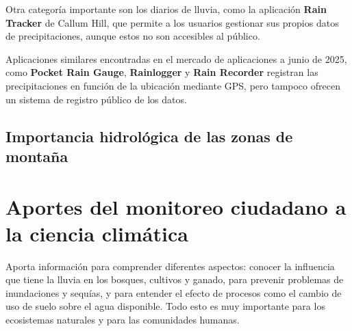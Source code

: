 Otra categoría importante son los diarios de lluvia, como la aplicación \textbf{Rain Tracker} de Callum Hill, que permite a los usuarios gestionar sus propios datos de precipitaciones, aunque estos no son accesibles al público. \cite{hill2021raintracker}

Aplicaciones similares encontradas en el mercado de aplicaciones a junio de 2025, como \textbf{Pocket Rain Gauge}, \textbf{Rainlogger} y \textbf{Rain Recorder} registran las precipitaciones en función de la ubicación mediante GPS, pero tampoco ofrecen un sistema de registro público de los datos.


\subsection{Importancia hidrológica de las zonas de montaña}











\newpage
\section{Aportes del monitoreo ciudadano a la ciencia climática}



Aporta información para comprender diferentes aspectos: conocer la influencia que tiene la lluvia en los bosques, cultivos y ganado, para prevenir problemas de inundaciones y sequías, y para entender el efecto de procesos como el cambio de uso de suelo sobre el agua disponible. Todo esto es muy importante para los ecosistemas naturales y para las comunidades humanas.

















